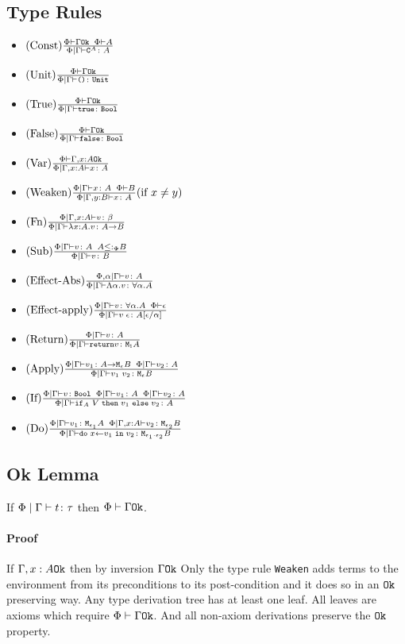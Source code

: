 {\subsection{Type Rules}
\begin{itemize}
    \item $(\text{Const}) \frac{\Phi\vdash \Gamma \texttt{Ok}\;\;\Phi\vdash A}{\Phi\mid\Gamma \vdash \texttt{C}^{A} \colon A}$
    \item $(\text{Unit}) \frac{\Phi\vdash \Gamma \texttt{Ok}}{\Phi\mid\Gamma \vdash \texttt{()} \colon \texttt{Unit}}$
    \item $(\text{True}) \frac{\Phi\vdash \Gamma \texttt{Ok}}{\Phi\mid\Gamma \vdash \texttt{true} \colon \texttt{Bool}}$
    \item $(\text{False}) \frac{\Phi\vdash \Gamma \texttt{Ok}}{\Phi\mid\Gamma \vdash \texttt{false} \colon \texttt{Bool}}$
    \item $(\text{Var}) \frac{\Phi\vdash \Gamma, x: A \texttt{Ok}}{\Phi\mid\Gamma, x: A \vdash x \colon A}$
    \item $(\text{Weaken}) \frac{\Phi\mid\Gamma \vdash x \colon A\;\;\Phi\vdash B}{\Phi\mid\Gamma, y: B \vdash x \colon A}(\text{if } x \neq y)$
    \item $(\text{Fn}) \frac{\Phi\mid\Gamma, x: A \vdash v \colon \beta}{\Phi\mid\Gamma \vdash \lambda x : A. v \colon A\rightarrow B}$
    \item $(\text{Sub}) \frac{\Phi\mid\Gamma \vdash v \colon A\;\; A \leq:_\Phi B}{\Phi\mid\Gamma \vdash v \colon B}$
    \item $(\text{Effect-Abs}) \frac{\Phi,\alpha\mid\Gamma \vdash v \colon A}{\Phi\mid\Gamma \vdash \Lambda \alpha. v \colon \forall \alpha. A}$
    \item $(\text{Effect-apply}) \frac{\Phi\mid\Gamma \vdash v \colon \forall \alpha. A\;\;\Phi\vdash \epsilon}{\Phi\mid\Gamma \vdash v\;\epsilon \colon A\left[\epsilon / \alpha\right]}$
    \item $(\text{Return}) \frac{\Phi\mid\Gamma \vdash v \colon A}{\Phi\mid\Gamma \vdash \texttt{return} v \colon \texttt{M}_{\texttt{1}}{A}}$
    \item $(\text{Apply}) \frac{\Phi\mid\Gamma \vdash v_1 \colon A \rightarrow \texttt{M}_{\epsilon}{B}\;\;\Phi\mid\Gamma \vdash v_2 \colon A}{\Phi\mid\Gamma \vdash v_1\; v_2 \colon \texttt{M}_{\epsilon}{B}}$
    \item $(\text{If}) \frac{\Phi\mid\Gamma \vdash v \colon \texttt{Bool} \;\; \Phi\mid\Gamma \vdash v_1 \colon A\;\;\Phi\mid\Gamma \vdash v_2 \colon A}{\Phi\mid\Gamma \vdash \texttt{if}_{A}\; V\; \texttt{then}\; v_1 \;\texttt{else} \; v_2 \colon A}$
    \item $(\text{Do}) \frac{\Phi\mid\Gamma \vdash v_1 \colon \texttt{M}_{\epsilon_1}{A} \;\; \Phi\mid\Gamma, x: A \vdash v_2 \colon \texttt{M}_{\epsilon_2}{B}}{\Phi\mid\Gamma \vdash \texttt{do}\; x \leftarrow v_1 \;\texttt{in}\; v_2 \colon \texttt{M}_{\epsilon_1 \cdot \epsilon_2}{B}}$
\end{itemize}

\subsection{Ok Lemma}
If $\Phi\mid\Gamma \vdash t \colon \tau$ then $\Phi\vdash \Gamma \texttt{Ok}$.
\paragraph{Proof}
If $\Gamma, x: A \texttt{Ok}$ then by inversion $\Gamma \texttt{Ok}$
Only the type rule \texttt{Weaken} adds terms to the environment from its preconditions to its post-condition and it does so in an $\texttt{Ok}$ preserving way. Any type derivation tree has at least one leaf. All leaves are axioms which require $\Phi\vdash \Gamma \texttt{Ok}$. And all non-axiom derivations preserve the $\texttt{Ok}$ property.


}

\ifdefined\NoDocument
\else
\documentclass{report}


    \LanguageDefinition

\fi
